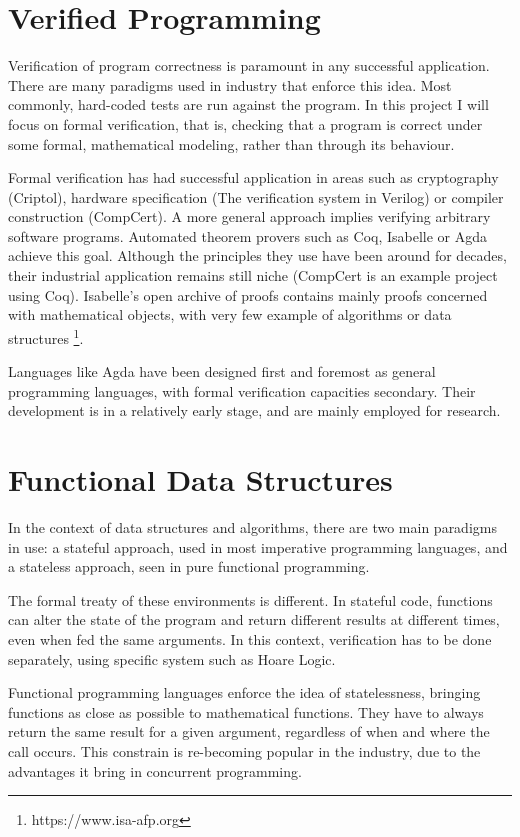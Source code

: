 \documentclass[12pt,twoside,notitlepage]{report}
\begin{document}
\section{Verified Programming}

Verification of program correctness is paramount in any successful application. There are many paradigms used in industry that enforce this idea. Most commonly, hard-coded tests are run against the program. In this project I will focus on formal verification, that is, checking that a program is correct under some formal, mathematical modeling, rather than through its behaviour.
	
Formal verification has had successful application in areas such as  cryptography (Criptol), hardware specification (The verification system in Verilog) or compiler construction (CompCert). 
A more general approach implies verifying arbitrary software programs. Automated theorem provers such as Coq, Isabelle or Agda achieve this goal. Although the principles they use have been around for decades, their industrial application remains still niche (CompCert is an example project using Coq). Isabelle’s open archive of proofs contains mainly proofs concerned with mathematical objects, with very few example of algorithms or data structures \footnote{https://www.isa-afp.org}. 
	
Languages like Agda have been designed first and foremost as general programming languages, with formal verification capacities secondary. Their development is in a relatively early stage, and are mainly employed for research. 

\section{Functional Data Structures}

In the context of data structures and algorithms, there are two main paradigms in use: a stateful approach, used in most imperative programming languages, and a stateless approach, seen in pure functional programming.

The formal treaty of these environments is different. In stateful code, functions can alter the state of the program and return different results at different times, even when fed the same arguments. In this context, verification has to be done separately, using specific system such as Hoare Logic.

Functional programming languages enforce the idea of statelessness, bringing functions as close as possible to mathematical functions. They have to always return the same result for a given argument, regardless of when and where the call occurs. This constrain is re-becoming popular in the industry, due to the advantages it bring in concurrent programming.
 
\end{document}
